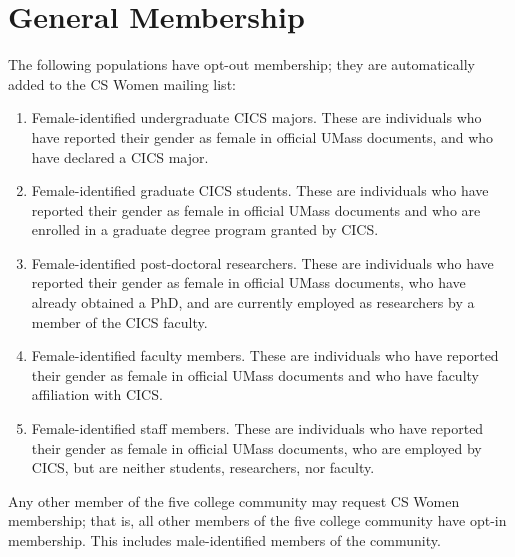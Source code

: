 \section{General Membership}
\label{sec:membership}
The following populations have opt-out membership; they are automatically added to the CS Women mailing list:
\begin{enumerate}
	\item Female-identified undergraduate CICS majors. These are individuals who have reported their gender as female in official UMass documents, and who have declared a CICS major.
	\item Female-identified graduate CICS students. These are individuals who have reported their gender as female in official UMass documents and who are enrolled in a graduate degree program granted by CICS.
	\item Female-identified post-doctoral researchers. These are individuals who have reported their gender as female in official UMass documents, who have already obtained a PhD, and are currently employed as researchers by a member of the CICS faculty.
	\item Female-identified faculty members. These are individuals who have reported their gender as female in official UMass documents and who have faculty affiliation with CICS.
	\item Female-identified staff members. These are individuals who have reported their gender as female in official UMass documents, who are employed by CICS, but are neither students, researchers, nor faculty.
\end{enumerate}

Any other member of the five college community may request CS Women membership; that is, all other members of the five college community have opt-in membership. This includes male-identified members of the community. 